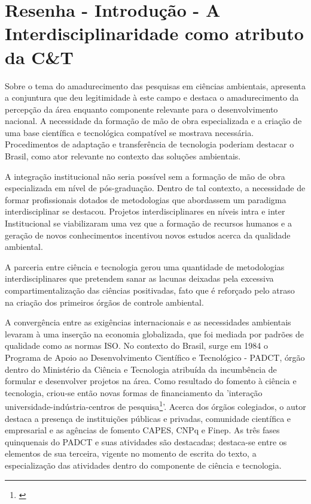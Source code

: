 \documentclass[
   article,       %
   12pt,          %
   oneside,       %
   a4paper,       %
   english,       %
   brazil,           %
   sumario=tradicional
   ]{abntex2}
\begin{document}

\frenchspacing 

\maketitle

\textual

\newpage

\section{Resenha - Introdução - A Interdisciplinaridade como atributo da C\&T}


Sobre o tema do amadurecimento das pesquisas em ciências ambientais, \cite{Interdisciplinaridade_CT} apresenta a conjuntura que deu legitimidade à este campo e destaca o amadurecimento da percepção da área enquanto componente relevante para o desenvolvimento nacional. A necessidade da formação de mão de obra especializada e a criação de uma base científica e tecnológica compatível se mostrava necessária. Procedimentos de adaptação e transferência de tecnologia poderiam destacar o Brasil, como ator relevante no contexto das soluções ambientais.

A integração institucional não seria possível sem a formação de mão de obra especializada em nível de pós-graduação. Dentro de tal contexto, a necessidade de formar profissionais dotados de metodologias que abordassem um paradigma interdisciplinar se destacou. Projetos interdisciplinares en níveis intra e inter Institucional se viabilizaram uma vez que a formação de recursos humanos e a geração de novos conhecimentos incentivou novos estudos acerca da qualidade ambiental. 

A parceria entre ciência e tecnologia gerou uma quantidade de metodologias interdisciplinares que pretendem sanar as lacunas deixadas pela excessiva compartimentalização das ciências positivadas, fato que é reforçado pelo atraso na criação dos primeiros órgãos de controle ambiental.

A convergência entre as exigências internacionais e as necessidades ambientais levaram à uma inserção na economia globalizada, que foi mediada por padrões de qualidade como as normas ISO. No contexto do Brasil, surge em 1984 o Programa de Apoio ao Desenvolvimento Científico e Tecnológico - PADCT, órgão dentro do Ministério da Ciência e Tecnologia atribuída da incumbência de formular e desenvolver projetos na área. Como resultado do fomento à ciência e tecnologia, criou-se então novas formas de financiamento da 'interação universidade-indústria-centros de pesquisa\footnote{\cite[p.7]{Interdisciplinaridade_CT}}'. Acerca dos órgãos colegiados, o autor destaca a presença de instituições públicas e privadas, comunidade científica e empresarial e as agências de fomento CAPES, CNPq e Finep. As três fases quinquenais do PADCT e suas atividades são destacadas; destaca-se entre os elementos de sua terceira, vigente no momento de escrita do texto, a especialização das atividades dentro do componente de ciência e tecnologia.
\end{document}
